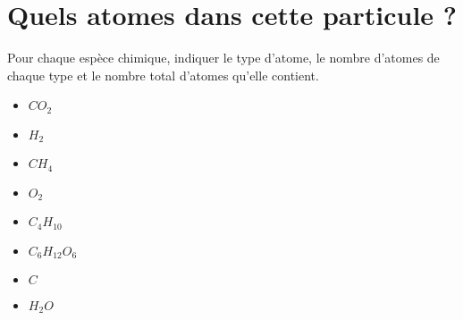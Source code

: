\section{Quels atomes dans cette particule ?}\label{ex:particule}



\begin{questions}
	\question[] Pour chaque espèce chimique, indiquer le type d'atome, le nombre d'atomes de chaque type et le nombre total d'atomes qu'elle contient.
	 
	\begin{multicols}{4}
		\begin{itemize}
			\item $CO_2$
			\item $H_2$
			\item $CH_4$
			\item $O_2$
			\item $C_4H_{10} $
			\item $C_6H_{12} O_6$
			\item $C$
			\item $H_2O$
		\end{itemize}
	\end{multicols}
	
\end{questions}